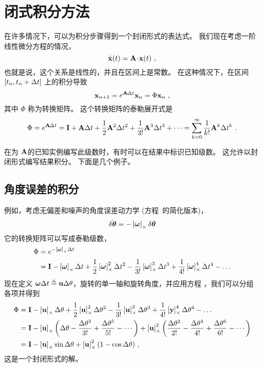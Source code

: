 
\section{闭式积分方法}
\label{sec:ClosedFormInt}

在许多情况下，可以为积分步骤得到一个封闭形式的表达式。 
我们现在考虑一阶线性微分方程的情况，
%
\begin{equation}
\dot{{\bf x}}(t)={\bf A}\!\cdot\!{\bf x}(t)~,
\end{equation}
%
也就是说，这个关系是线性的，并且在区间上是常数。 
在这种情况下，在区间 $[t_n , t_n+\Delta t]$ 上的积分导致
%
\begin{equation}
{\bf x}_{n+1}= e^{{\bf A}\!\cdot\!\Delta t}{\bf x}_n = \Phi{\bf x}_n~,
\end{equation}
%
其中 $\Phi$ 称为转换矩阵。 
这个转换矩阵的泰勒展开式是
%
\begin{equation}
\Phi= e^{{\bf A}\!\cdot\!\Delta t}={\bf I} + {\bf A}\Delta t + \frac{1}{2} {\bf A}^2\Delta t^2 + \frac{1}{3!}{\bf A}^3\Delta t^3 + \dots   = \sum_{k=0}^\infty \frac{1}{k!}{\bf A}^k\Delta t^k ~.
\label{equ:TaylorExp}
\end{equation}


在为 ${\bf A}$的已知实例编写此级数时，有时可以在结果中标识已知级数。 
这允许以封闭形式编写结果积分。 
下面是几个例子。

\subsection{角度误差的积分}
\label{sec:ClosedFormAngle}

例如，考虑无偏差和噪声的角度误差动力学 (方程~的简化版本)，
%
\begin{equation}
\dot{\delta{\bm \theta}} = -\left[{\bm \omega}\right]_\times\delta{\bm \theta} 
\end{equation}
%
它的转换矩阵可以写成泰勒级数，
%
%
\begin{align}
\Phi &= e^{-\left[{\bm \omega}\right]_\times\Delta t} \label{equ:phiexp}\\
&= {\bf I} -\left[{\bm \omega}\right]_\times\Delta t + \frac12\left[{\bm \omega}\right]_\times^2\Delta t^2 - \frac{1}{3!}\left[{\bm \omega}\right]_\times^3\Delta t^3 + \frac{1}{4!}\left[{\bm \omega}\right]_\times^4\Delta t^4 - \dots 
\end{align}%
%
现在定义 ${\bm \omega}\Delta t \triangleq {\bf u} \Delta\theta$，旋转的单一轴和旋转角度，并应用方程 ，我们可以分组各项并得到
%
%
\begin{align}
\Phi 
&= {\bf I} -\left[{\bf u}\right]_\times\Delta\theta + \frac12\left[{\bf u}\right]_\times^2\Delta\theta^2 - \frac{1}{3!}\left[{\bf u}\right]_\times^3\Delta\theta^3 + \frac{1}{4!}\left[{\bf y}\right]_\times^4\Delta\theta^4 - \dots \nonumber\\
&= {\bf I} - \left[{\bf u}\right]_\times\left(\Delta\theta - \frac{\Delta\theta^3}{3!} + \frac{\Delta\theta^5}{5!} - \cdots\right) + \left[{\bf u}\right]_\times^2\left(\frac{\Delta\theta^2}{2!} - \frac{\Delta\theta^4}{4!}  + \frac{\Delta\theta^6}{6!} - \cdots\right) \nonumber\\
&= {\bf I} - \left[{\bf u}\right]_\times\sin\Delta\theta + \left[{\bf u}\right]_\times^2(1-\cos\Delta\theta) ~,
\end{align}%
%
这是一个封闭形式的解。

